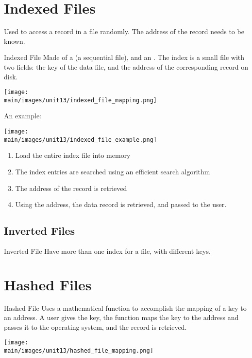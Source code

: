 \documentclass[\main/notes.tex]{subfiles}
\begin{document}
		\section{Indexed Files}
			Used to access a record in a file randomly. The address of the record needs to be known.
			\begin{definition}{Indexed File}
				Made of a  (a sequential file), and an . The index is a small file with two fields: the key of the data file, and the address of the corresponding record on disk.

				\begin{center}
					\texttt{[image: \\main/images/unit13/indexed\_file\_mapping.png]}
				\end{center}

				An example:
				\begin{center}
					\texttt{[image: \\main/images/unit13/indexed\_file\_example.png]}
				\end{center}
			\end{definition}
			\begin{enumerate}[nosep]
				\item Load the entire index file into memory
				\item The index entries are searched using an efficient search algorithm
				\item The address of the record is retrieved
				\item Using the address, the data record is retrieved, and passed to the user.
			\end{enumerate}
			\subsection{Inverted Files}
				\begin{definition}{Inverted File}
					Have more than one index for a file, with different keys.
				\end{definition}

		\section{Hashed Files}
				\begin{definition}{Hashed File}
					Uses a mathematical function to accomplish the mapping of a key to an address. A user gives the key, the function maps the key to the address and passes it to the operating system, and the record is retrieved.
					\begin{center}
						\texttt{[image: \\main/images/unit13/hashed\_file\_mapping.png]}
					\end{center}
				\end{definition}
\end{document}
